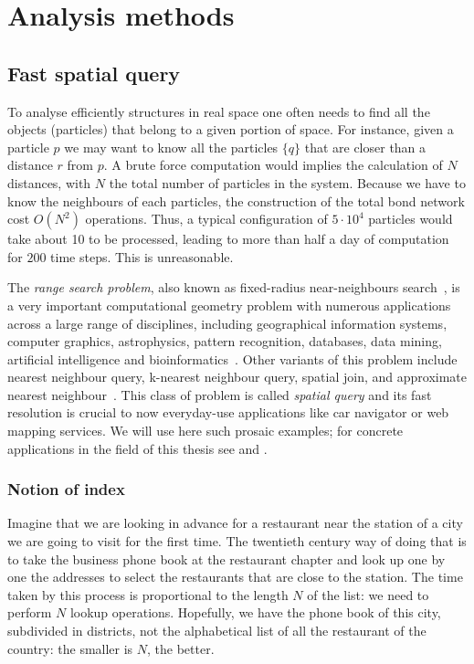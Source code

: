 \chapter{Analysis methods}

\section{Fast spatial query}
\label{sec:spatial_query}

To analyse efficiently structures in real space one often needs to find all the objects (particles) that belong to a given portion of space. For instance, given a particle $p$ we may want to know all the particles $\{q\}$ that are closer than a distance $r$ from $p$. A brute force computation would implies the calculation of $N$ distances, with $N$ the total number of particles in the system. Because we have to know the neighbours of each particles, the construction of the total bond network cost $O(N^2)$ operations. Thus, a typical configuration of $5 \cdot 10^4$ particles would take about \unit{10}{\minute} to be processed, leading to more than half a day of computation for $200$ time steps. This is unreasonable.

The \emph{range search problem}, also known as fixed-radius near-neighbours search~\citep{Dickerson1996}, is a very important computational geometry problem with numerous applications across a large range of disciplines, including geographical information systems, computer graphics, astrophysics, pattern recognition, databases, data mining, artificial intelligence and bioinformatics~\citep{Chavez2001}. Other variants of this problem include nearest neighbour query, k-nearest neighbour query, spatial join, and approximate nearest neighbour~\citep{Roussopoulos1995, Chavez2001}. This class of problem is called \emph{spatial query} and its fast resolution is crucial to now everyday-use applications like car navigator or web mapping services. We will use here such prosaic examples; for concrete applications in the field of this thesis see  and .

\subsection{Notion of index}

Imagine that we are looking in advance for a restaurant near the station of a city we are going to visit for the first time. The twentieth century way of doing that is to take the business phone book at the restaurant chapter and look up one by one the addresses to select the restaurants that are close to the station. The time taken by this process is proportional to the length $N$ of the list: we need to perform $N$ lookup operations. Hopefully, we have the phone book of this city, subdivided in districts, not the alphabetical list of all the restaurant of the country: the smaller is $N$, the better.

